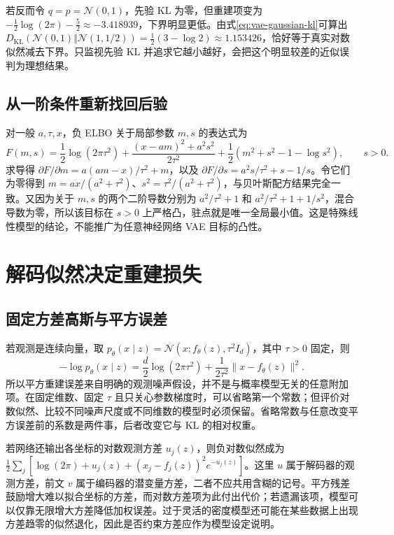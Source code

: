 \documentclass[UTF8,12pt,a4paper,fontset=fandol]{ctexart}
\begin{document}
若反而令 $q=p=\mathcal N(0,1)$，先验 KL 为零，但重建项变为 $-\tfrac12\log(2\pi)-\tfrac52\approx-3.418939$，下界明显更低。由式\eqref{eq:vae-gaussian-kl}可算出 $D_{\mathrm{KL}}(\mathcal N(0,1)\Vert\mathcal N(1,1/2))=\tfrac12(3-\log2)\approx1.153426$，恰好等于真实对数似然减去下界。只监视先验 KL 并追求它越小越好，会把这个明显较差的近似误判为理想结果。

\subsection{从一阶条件重新找回后验}
对一般 $a,\tau,x$，负 ELBO 关于局部参数 $m,s$ 的表达式为
\begin{equation}
 F(m,s)=\frac12\log(2\pi\tau^2)
 +\frac{(x-am)^2+a^2s^2}{2\tau^2}
 +\frac12(m^2+s^2-1-\log s^2),\qquad s>0.
 \label{eq:vae-local-objective}
\end{equation}
求导得 $\partial F/\partial m=a(am-x)/\tau^2+m$，以及 $\partial F/\partial s=a^2s/\tau^2+s-1/s$。令它们为零得到 $m=ax/(a^2+\tau^2)$、$s^2=\tau^2/(a^2+\tau^2)$，与贝叶斯配方结果完全一致。又因为关于 $m,s$ 的两个二阶导数分别为 $a^2/\tau^2+1$ 和 $a^2/\tau^2+1+1/s^2$，混合导数为零，所以该目标在 $s>0$ 上严格凸，驻点就是唯一全局最小值。这是特殊线性模型的结论，不能推广为任意神经网络 VAE 目标的凸性。

\section{解码似然决定重建损失}
\label{sec:vae-likelihood-choice}

\subsection{固定方差高斯与平方误差}
若观测是连续向量，取 $p_\theta(x\mid z)=\mathcal N(x;f_\theta(z),\tau^2I_d)$，其中 $\tau>0$ 固定，则
\begin{equation}
 -\log p_\theta(x\mid z)=\frac{d}{2}\log(2\pi\tau^2)
            +\frac{1}{2\tau^2}\|x-f_\theta(z)\|^2.
 \label{eq:vae-gaussian-nll}
\end{equation}
所以平方重建误差来自明确的观测噪声假设，并不是与概率模型无关的任意附加项。在固定维数、固定 $\tau$ 且只关心参数梯度时，可以省略第一个常数；但评价对数似然、比较不同噪声尺度或不同维数的模型时必须保留。省略常数与任意改变平方误差前的系数是两件事，后者改变它与 KL 的相对权重。

若网络还输出各坐标的对数观测方差 $u_j(z)$，则负对数似然成为 $\tfrac12\sum_j[\log(2\pi)+u_j(z)+(x_j-f_j(z))^2e^{-u_j(z)}]$。这里 $u$ 属于解码器的观测方差，前文 $v$ 属于编码器的潜变量方差，二者不应共用含糊的记号。平方残差鼓励增大难以拟合坐标的方差，而对数方差项为此付出代价；若遗漏该项，模型可以仅靠无限增大方差降低加权误差。过于灵活的密度模型还可能在某些数据上出现方差趋零的似然退化，因此是否约束方差应作为模型设定说明。
\end{document}
